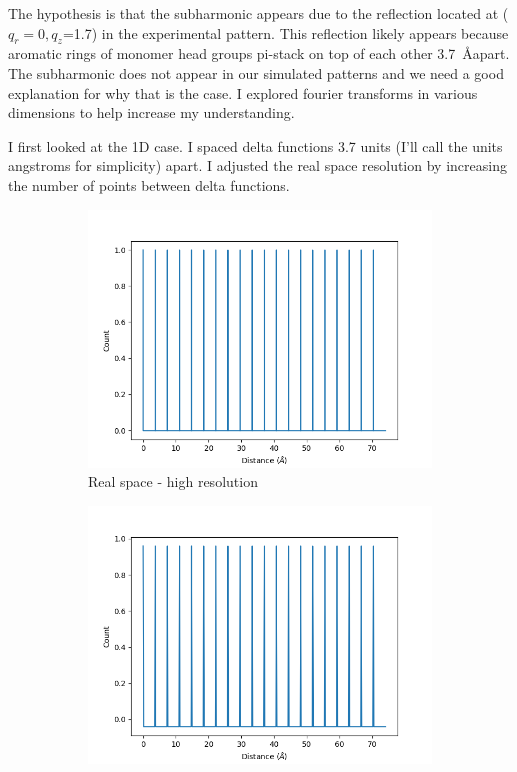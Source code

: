 \documentclass{article}
\begin{document}
The hypothesis is that the subharmonic appears due to the reflection located at
($q_r=0,q_z$=1.7) in the experimental pattern. This reflection likely appears
because aromatic rings of monomer head groups pi-stack on top of each other
3.7~\AA apart. The subharmonic does not appear in our simulated patterns and
we need a good explanation for why that is the case. I explored fourier
transforms in various dimensions to help increase my understanding.
  
I first looked at the 1D case. I spaced delta functions 3.7 units (I'll call
the units angstroms for simplicity) apart. I adjusted the real space resolution
by increasing the number of points between delta functions. 

\begin{figure}
        \begin{subfigure}{0.33\textwidth}
                \centering
                \includegraphics[width=\textwidth]{real_delta_1d_highres.png}
                \caption{Real space - high resolution}\label{fig:real_delta_1d_highres}
        \end{subfigure}
        \begin{subfigure}{0.33\textwidth}
                \centering
                \includegraphics[width=\textwidth]{real_delta_1d_medres.png}

\end{subfigure}
\end{figure}
\end{document}

